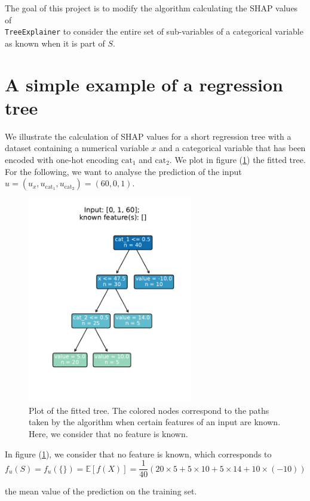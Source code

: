 \documentclass[11pt]{article}
\begin{document}
The goal of this project is to modify the algorithm calculating the SHAP values of \\ \texttt{TreeExplainer} to consider 
the entire set of sub-variables of a categorical variable as known when it is part of $S$.

\section*{A simple example of a regression tree}

We illustrate the calculation of SHAP values for a short regression tree with a dataset containing a 
numerical variable $x$ and a categorical variable that has been encoded with one-hot encoding $\text{cat}_1$ and $\text{cat}_2$.
We plot in figure (\ref{fig:tree0}) the fitted tree. For the following, we want to analyse the prediction of the input 
$u = (u_x, u_{\text{cat}_1}, u_{\text{cat}_2}) = (60,0,1)$.

\begin{figure}[H]
    \centering
    \includegraphics[height=9cm]{"../outputs/plot_tree/figures/path_0_known.pdf"}
    \caption{Plot of the fitted tree. The colored nodes correspond to the paths taken 
    by the algorithm when certain features of an input are known. Here, we consider that 
    no feature is known.}
    \label{fig:tree0}
\end{figure}

In figure (\ref{fig:tree0}), we consider that no feature is known, which corresponds to 
$$f_u(S) = f_u(\{\}) = \mathbb{E}[f(X)] = \frac{1}{40}\left(20 \times 5 + 5 \times 10 + 5 \times 14 + 10 \times (-10)\right)$$

the mean value of the prediction on the training set.
\end{document}
